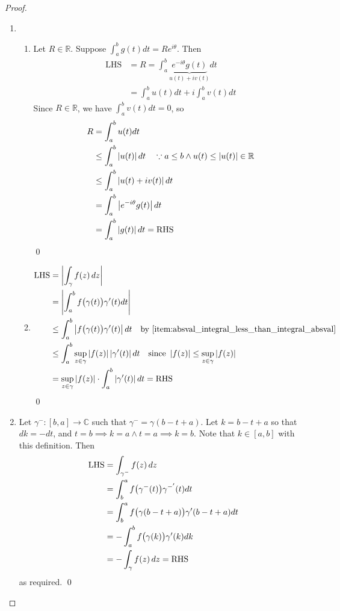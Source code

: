 \documentclass[11pt, oneside]{book}
\begin{document}
\begin{proof}
\begin{enumerate}
		\item \begin{enumerate}
			\item Let $R \in \mathbb{R}$. Suppose $\int_{a}^{b} g(t) dt = Re^{i \theta}$. Then
				\begin{align*}
					\text{LHS} &= R = \int_{a}^{b} \underbrace{e^{-i \theta} g(t)}_{u(t) + iv(t)} dt \\
						&= \int_{a}^{b} u(t) dt + i \int_{a}^{b} v(t) dt
				\end{align*}
				Since $R \in \mathbb{R}$, we have $\int_{a}^{b} v(t) dt = 0$, so
				\begin{align*}
					R &= \int_{a}^{b} u(t) dt \\
					  &\leq \int_{a}^{b} \left|u(t)\right| dt \quad \because a \leq b \land u(t) \leq \left|u(t)\right| \in \mathbb{R} \\
					  &\leq \int_{a}^{b} \left|u(t) + iv(t)\right| dt \\
					  &= \int_{a}^{b} \left|e^{-i \theta} g(t)\right| \mathop{}\!d{t} \\
					  &= \int_{a}^{b} \left|g(t)\right| dt = \text{RHS}
				\end{align*} \qed
			\item \begin{align*}
					\text{LHS} &= \abs{\int_{\gamma} f(z) \dif{z}} \\
						&= \abs{\int_{a}^{b} f\big( \gamma(t) \big) \gamma'(t) dt} \\
						&\leq \int_{a}^{b} \abs{f\big( \gamma(t) \big) \gamma'(t)} dt \quad \text{by } \cref{item:absval_integral_less_than_integral_absval} \\
						&\leq \int_{a}^{b} \sup_{z \in \gamma} \abs{f(z)} \abs{\gamma'(t)} dt \quad \text{since } \abs{f(z)} \leq \sup_{z \in \gamma} \abs{f(z)} \\
						&= \sup_{z \in \gamma} \abs{f(z)} \cdot \int_{a}^{b} \abs{\gamma'(t)} dt = \text{RHS}
				\end{align*}\qed
		\end{enumerate}
		\item Let $\gamma^-: [b, a] \to \mathbb{C}$ such that $\gamma^- = \gamma(b - t + a)$. Let $k = b - t + a$ so that $dk = -dt$, and $t = b \implies k = a \land t = a \implies k = b$. Note that $k \in [a, b]$ with this definition. Then
			\begin{align*}
				\text{LHS} &= \int_{\gamma^-} f(z) \mathop{}\!d{z} \\
					&= \int_{b}^{a} f\big( \gamma^- (t) \big) \gamma^{-'}(t) dt \\
					&= \int_{b}^{a} f\big( \gamma(b - t + a) \big) \gamma'(b - t + a) dt \\
					&= - \int_{a}^{b} f\big(\gamma(k)\big) \gamma'(k) dk \\
					&= - \int_{\gamma} f(z) \mathop{}\!d{z} = \text{RHS}
			\end{align*}
			as required. \qed
	\end{enumerate}
\end{proof}
\end{document}

